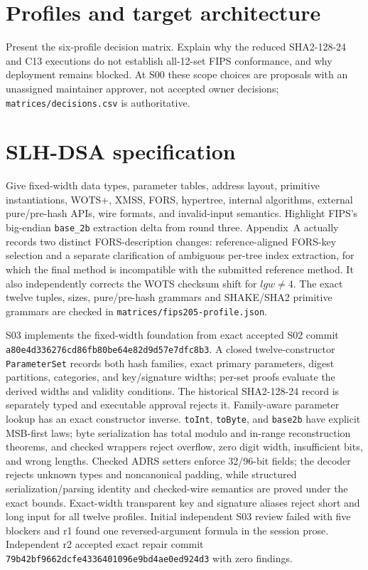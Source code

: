\documentclass[11pt]{article}
\begin{document}
\section{Profiles and target architecture}
Present the six-profile decision matrix. Explain why the reduced SHA2-128-24 and C13 executions do
not establish all-12-set FIPS conformance, and why deployment remains blocked.
At S00 these scope choices are proposals with an unassigned maintainer approver, not accepted owner
decisions; \texttt{matrices/decisions.csv} is authoritative.

\section{SLH-DSA specification}
Give fixed-width data types, parameter tables, address layout, primitive instantiations, WOTS+, XMSS,
FORS, hypertree, internal algorithms, external pure/pre-hash APIs, wire formats, and invalid-input
semantics. Highlight FIPS's big-endian \texttt{base\_2b} extraction delta from round three.
Appendix~A actually records two distinct FORS-description changes: reference-aligned FORS-key
selection and a separate clarification of ambiguous per-tree index extraction, for which the final
method is incompatible with the submitted reference method. It also independently corrects the WOTS
checksum shift for \(\mathit{lgw}\ne4\). The exact twelve tuples, sizes, pure/pre-hash grammars and
SHAKE/SHA2 primitive grammars are checked in \texttt{matrices/fips205-profile.json}.

S03 implements the fixed-width foundation from exact accepted S02 commit
\texttt{a80e4d336276cd86fb80be64e82d9d57e7dfc8b3}. A closed twelve-constructor
\texttt{ParameterSet} records both hash families, exact primary parameters, digest partitions,
categories, and key/signature widths; per-set proofs evaluate the derived widths and validity
conditions. The historical SHA2-128-24 record is separately typed and executable approval rejects
it. Family-aware parameter lookup has an exact constructor inverse. \texttt{toInt},
\texttt{toByte}, and \texttt{base2b} have explicit MSB-first laws; byte serialization has total
modulo and in-range reconstruction theorems, and checked wrappers reject overflow, zero digit width,
insufficient bits, and wrong lengths. Checked ADRS setters enforce 32/96-bit fields; the decoder
rejects unknown types and noncanonical padding, while structured serialization/parsing identity and
checked-wire semantics are proved under the exact bounds. Exact-width transparent key and signature
aliases reject short and long input for all twelve profiles. Initial independent S03 review failed
with five blockers and r1 found one reversed-argument formula in the session prose. Independent r2
accepted exact repair commit
\texttt{79b42bf9662dcfe4336401096e9bd4ae0ed924d3} with zero findings.
\end{document}
